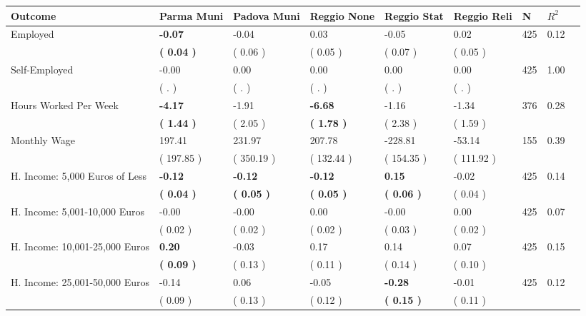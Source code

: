\begin{tabular}{L{6.2cm} C{1.8cm} C{1.8cm} C{1.8cm} C{1.8cm} C{1.8cm} C{1.8cm} C{0.3cm} C{0.3cm}}
\toprule
 \textbf{Outcome} & \textbf{Parma Muni} & \textbf{Padova Muni} & \textbf{Reggio None} & \textbf{Reggio Stat} & \textbf{Reggio Reli} & \textbf{N} & \textbf{$ R^2$} \\
\midrule
Employed & \textbf{    -0.07} &     -0.04 &      0.03 &     -0.05 &      0.02  & 425 &       0.12 \\ 
 & \textbf{(     0.04 )} & (     0.06 ) & (     0.05 ) & (     0.07 ) & (     0.05 )  & \\
Self-Employed &     -0.00 &      0.00 &      0.00 &      0.00 &      0.00  & 425 &       1.00 \\ 
 & (        . ) & (        . ) & (        . ) & (        . ) & (        . )  & \\
Hours Worked Per Week & \textbf{    -4.17} &     -1.91 & \textbf{    -6.68} &     -1.16 &     -1.34  & 376 &       0.28 \\ 
 & \textbf{(     1.44 )} & (     2.05 ) & \textbf{(     1.78 )} & (     2.38 ) & (     1.59 )  & \\
Monthly Wage &    197.41 &    231.97 &    207.78 &   -228.81 &    -53.14  & 155 &       0.39 \\ 
 & (   197.85 ) & (   350.19 ) & (   132.44 ) & (   154.35 ) & (   111.92 )  & \\
H. Income: 5,000 Euros of Less & \textbf{    -0.12} & \textbf{    -0.12} & \textbf{    -0.12} & \textbf{     0.15} &     -0.02  & 425 &       0.14 \\ 
 & \textbf{(     0.04 )} & \textbf{(     0.05 )} & \textbf{(     0.05 )} & \textbf{(     0.06 )} & (     0.04 )  & \\
H. Income: 5,001-10,000 Euros &     -0.00 &     -0.00 &      0.00 &     -0.00 &      0.00  & 425 &       0.07 \\ 
 & (     0.02 ) & (     0.02 ) & (     0.02 ) & (     0.03 ) & (     0.02 )  & \\
H. Income: 10,001-25,000 Euros & \textbf{     0.20} &     -0.03 &      0.17 &      0.14 &      0.07  & 425 &       0.15 \\ 
 & \textbf{(     0.09 )} & (     0.13 ) & (     0.11 ) & (     0.14 ) & (     0.10 )  & \\
H. Income: 25,001-50,000 Euros &     -0.14 &      0.06 &     -0.05 & \textbf{    -0.28} &     -0.01  & 425 &       0.12 \\ 
 & (     0.09 ) & (     0.13 ) & (     0.12 ) & \textbf{(     0.15 )} & (     0.11 )  & \\

\end{tabular}
